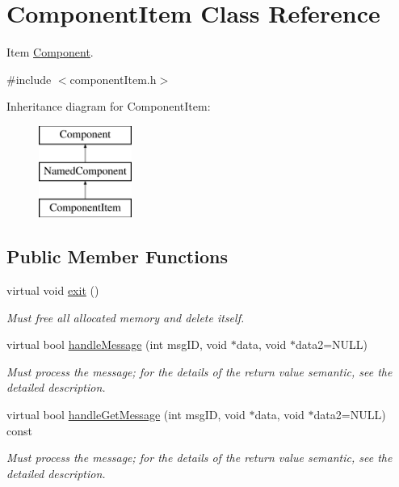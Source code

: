 \hypertarget{classComponentItem}{
\section{\-Component\-Item \-Class \-Reference}
\label{d9/de9/classComponentItem}
}


\-Item \hyperlink{classComponent}{\-Component}.  




{\ttfamily \#include $<$component\-Item.\-h$>$}

\-Inheritance diagram for \-Component\-Item\-:\begin{figure}[H]
\begin{center}
\leavevmode
\includegraphics[height=3.000000cm]{d9/de9/classComponentItem}
\end{center}
\end{figure}
\subsection*{\-Public \-Member \-Functions}
\begin{DoxyCompactItemize}
\item 
\hypertarget{classComponentItem_ab09298a5e65c927502137dcc63d03020}{
virtual void \hyperlink{classComponentItem_ab09298a5e65c927502137dcc63d03020}{exit} ()}
\label{d9/de9/classComponentItem_ab09298a5e65c927502137dcc63d03020}

\begin{DoxyCompactList}\small\item\em \-Must free all allocated memory and delete itself. \end{DoxyCompactList}\item 
virtual bool \hyperlink{classComponentItem_adfb824da7216b5c137dce6a8ef781765}{handle\-Message} (int msg\-I\-D, void $\ast$data, void $\ast$data2=\-N\-U\-L\-L)
\begin{DoxyCompactList}\small\item\em \-Must process the message; for the details of the return value semantic, see the detailed description. \end{DoxyCompactList}\item 
virtual bool \hyperlink{classComponentItem_adfac258c1dbc413f6339703b2ccf3745}{handle\-Get\-Message} (int msg\-I\-D, void $\ast$data, void $\ast$data2=\-N\-U\-L\-L) const 
\begin{DoxyCompactList}\small\item\em \-Must process the message; for the details of the return value semantic, see the detailed description. \end{DoxyCompactList}\end{DoxyCompactItemize}
